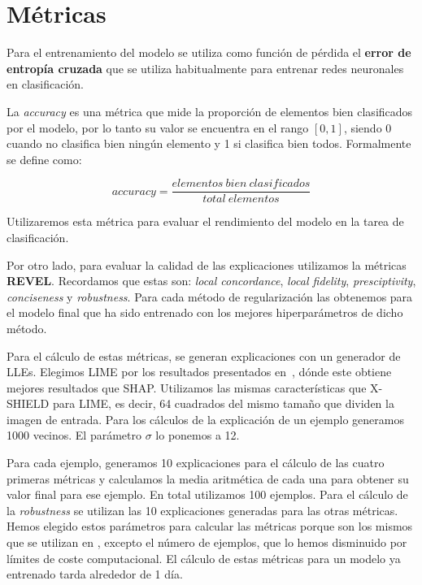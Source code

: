 \section{Métricas}

Para el entrenamiento del modelo se utiliza como función de pérdida el \textbf{error de entropía cruzada} que se utiliza habitualmente para entrenar redes neuronales en clasificación.

La \textit{accuracy} es una métrica que mide la proporción de elementos bien clasificados por el modelo, por lo tanto su valor se encuentra en el rango $[0,1]$, siendo 0 cuando no clasifica bien ningún elemento y 1 si clasifica bien todos. Formalmente se define como:

\begin{equation}
accuracy = \frac{elementos\ bien\ clasificados}{total\ elementos}
\end{equation}

Utilizaremos esta métrica para evaluar el rendimiento del modelo en la tarea de clasificación. 

Por otro lado, para evaluar la calidad de las explicaciones utilizamos la métricas \textbf{REVEL}. Recordamos que estas son: \textit{local concordance}, \textit{local fidelity}, \textit{presciptivity}, \textit{conciseness} y \textit{robustness}. Para cada método de regularización las obtenemos para el modelo final que ha sido entrenado con los mejores hiperparámetros de dicho método.

Para el cálculo de estas métricas, se generan explicaciones con un generador de LLEs. Elegimos LIME por los resultados presentados en~\cite{REVEL}, dónde este obtiene mejores resultados que SHAP. Utilizamos las mismas características que X-SHIELD para LIME, es decir, 64 cuadrados del mismo tamaño que dividen la imagen de entrada.  Para los cálculos de la explicación de un ejemplo generamos 1000 vecinos. El parámetro $\sigma$ lo ponemos a 12.

Para cada ejemplo, generamos 10 explicaciones para el cálculo de las cuatro primeras métricas y calculamos la media aritmética de cada una para obtener su valor final para ese ejemplo. En total utilizamos 100 ejemplos. Para el cálculo de la \textit{robustness} se utilizan las 10 explicaciones generadas para las otras métricas. Hemos elegido estos parámetros para calcular las métricas porque son los mismos que se utilizan en \cite{XSHIELD}, excepto el número de ejemplos, que lo hemos disminuido por límites de coste computacional. El cálculo de estas métricas para un modelo ya entrenado tarda alrededor de 1 día.


